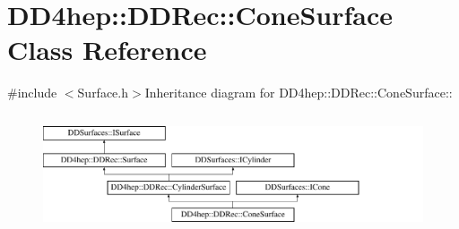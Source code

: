 \hypertarget{class_d_d4hep_1_1_d_d_rec_1_1_cone_surface}{
\section{DD4hep::DDRec::ConeSurface Class Reference}
\label{class_d_d4hep_1_1_d_d_rec_1_1_cone_surface}
}


{\ttfamily \#include $<$Surface.h$>$}Inheritance diagram for DD4hep::DDRec::ConeSurface::\begin{figure}[H]
\begin{center}
\leavevmode
\includegraphics[height=3.5387cm]{class_d_d4hep_1_1_d_d_rec_1_1_cone_surface}
\end{center}
\end{figure}
